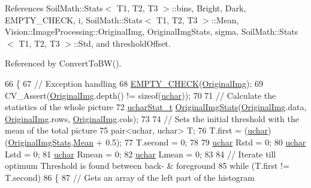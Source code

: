 References Soil\+Math\+::\+Stats$<$ T1, T2, T3 $>$\+::bins, Bright, Dark, E\+M\+P\+T\+Y\+\_\+\+C\+H\+E\+C\+K, i, Soil\+Math\+::\+Stats$<$ T1, T2, T3 $>$\+::\+Mean, Vision\+::\+Image\+Processing\+::\+Original\+Img, Original\+Img\+Stats, sigma, Soil\+Math\+::\+Stats$<$ T1, T2, T3 $>$\+::\+Std, and threshold\+Offset.



Referenced by Convert\+To\+B\+W().


\begin{DoxyCode}
66     \{
67         \textcolor{comment}{// Exception handling}
68         \hyperlink{_image_processing_8h_a27c4e53b88a0f9f2c097add555131056}{EMPTY\_CHECK}(\hyperlink{class_vision_1_1_image_processing_a77c370dab270158a4e9c634e2d3f48e7}{OriginalImg});
69         CV\_Assert(\hyperlink{class_vision_1_1_image_processing_a77c370dab270158a4e9c634e2d3f48e7}{OriginalImg}.depth() != \textcolor{keyword}{sizeof}(\hyperlink{_soil_math_types_8h_a65f85814a8290f9797005d3b28e7e5fc}{uchar}));
70 
71         \textcolor{comment}{// Calculate the statistics of the whole picture}
72         \hyperlink{class_soil_math_1_1_stats}{ucharStat\_t} \hyperlink{class_vision_1_1_segment_ab35cfe5504de7e5ea327991468e6cf3b}{OriginalImgStats}(\hyperlink{class_vision_1_1_image_processing_a77c370dab270158a4e9c634e2d3f48e7}{OriginalImg}.data, 
      \hyperlink{class_vision_1_1_image_processing_a77c370dab270158a4e9c634e2d3f48e7}{OriginalImg}.rows, \hyperlink{class_vision_1_1_image_processing_a77c370dab270158a4e9c634e2d3f48e7}{OriginalImg}.cols);
73 
74         \textcolor{comment}{// Sets the initial threshold with the mean of the total picture}
75         pair<uchar, uchar> T;
76         T.first = (\hyperlink{_soil_math_types_8h_a65f85814a8290f9797005d3b28e7e5fc}{uchar})(\hyperlink{class_vision_1_1_segment_ab35cfe5504de7e5ea327991468e6cf3b}{OriginalImgStats}.\hyperlink{class_soil_math_1_1_stats_a6f53982d52cf492ddd4df9b56bd014e7}{Mean} + 0.5);
77         T.second = 0;
78 
79         \hyperlink{_soil_math_types_8h_a65f85814a8290f9797005d3b28e7e5fc}{uchar} Rstd = 0;
80         \hyperlink{_soil_math_types_8h_a65f85814a8290f9797005d3b28e7e5fc}{uchar} Lstd = 0;
81         \hyperlink{_soil_math_types_8h_a65f85814a8290f9797005d3b28e7e5fc}{uchar} Rmean = 0;
82         \hyperlink{_soil_math_types_8h_a65f85814a8290f9797005d3b28e7e5fc}{uchar} Lmean = 0;
83 
84         \textcolor{comment}{// Iterate till optimum Threshold is found between back- & foreground}
85         \textcolor{keywordflow}{while} (T.first != T.second)
86         \{
87             \textcolor{comment}{// Gets an array of the left part of the histogram}

\end{DoxyCode}
